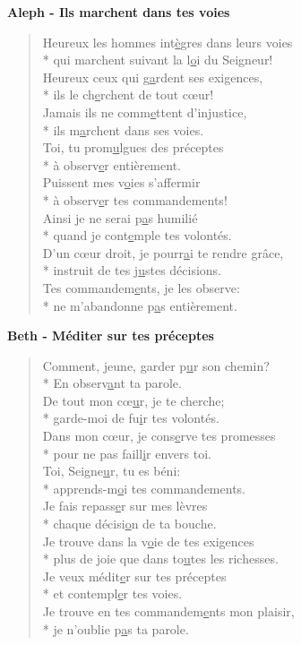 \textbf{Aleph - Ils marchent dans tes voies}
\begin{verse}
Heureux les hommes int\underline{è}gres dans leurs voies \\*
qui marchent suivant la l\underline{o}i du Seigneur! \\
Heureux ceux qui g\underline{a}rdent ses exigences, \\*
ils le ch\underline{e}rchent de tout cœur! \\
Jamais ils ne comm\underline{e}ttent d’injustice, \\*
ils m\underline{a}rchent dans ses voies. \\
Toi, tu prom\underline{u}lgues des préceptes \\*
à observ\underline{e}r entièrement. \\
Puissent mes v\underline{o}ies s’affermir \\*
à observ\underline{e}r tes commandements! \\
Ainsi je ne serai p\underline{a}s humilié \\*
quand je cont\underline{e}mple tes volontés. \\
D’un cœur droit, je pourr\underline{a}i te rendre grâce, \\*
instruit de tes j\underline{u}stes décisions. \\
Tes commandem\underline{e}nts, je les observe: \\*
ne m’abandonne p\underline{a}s entièrement. \\
\end{verse}
\textbf{Beth - Méditer sur tes préceptes}
\begin{verse}
Comment, jeune, garder p\underline{u}r son chemin? \\*
En observ\underline{a}nt ta parole. \\
De tout mon cœ\underline{u}r, je te cherche; \\*
garde-moi de fu\underline{i}r tes volontés. \\
Dans mon cœur, je cons\underline{e}rve tes promesses \\*
pour ne pas faill\underline{i}r envers toi. \\
Toi, Seigne\underline{u}r, tu es béni: \\*
apprends-m\underline{o}i tes commandements. \\
Je fais repass\underline{e}r sur mes lèvres \\*
chaque décisi\underline{o}n de ta bouche. \\
Je trouve dans la v\underline{o}ie de tes exigences \\*
plus de joie que dans to\underline{u}tes les richesses. \\
Je veux médit\underline{e}r sur tes préceptes \\*
et contempl\underline{e}r tes voies. \\
Je trouve en tes commandem\underline{e}nts mon plaisir, \\*
je n’oublie p\underline{a}s ta parole. \\
\end{verse}
